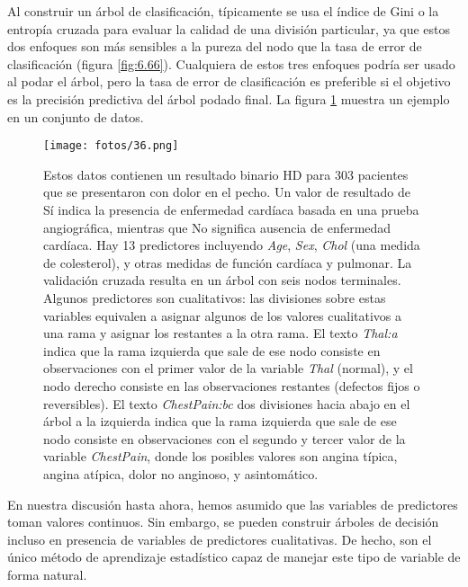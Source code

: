 Al construir un árbol de clasificación, típicamente se usa el índice de Gini o la entropía cruzada para evaluar la calidad de una división particular, ya que estos dos enfoques son más sensibles a la pureza del nodo que la tasa de error de clasificación (figura \ref{fig:6.66}). Cualquiera de estos tres enfoques podría ser usado al podar el árbol, pero la tasa de error de clasificación es preferible si el objetivo es la precisión predictiva del árbol podado final. La figura \ref{fig:6.7} muestra un ejemplo en un conjunto de datos. \\
\begin{figure}[h]
\centering
\texttt{[image: fotos/36.png]}
\caption{Estos datos contienen un resultado binario HD para 303 pacientes que se presentaron con dolor en el pecho. Un valor de resultado de Sí indica la presencia de enfermedad cardíaca basada en una prueba angiográfica, mientras que No significa ausencia de enfermedad cardíaca. Hay 13 predictores incluyendo \textit{Age}, \textit{Sex}, \textit{Chol} (una medida de colesterol), y otras medidas de función cardíaca y pulmonar. La validación cruzada resulta en un árbol con seis nodos terminales. Algunos predictores son cualitativos: las divisiones sobre estas variables equivalen a asignar algunos de los valores cualitativos a una rama y asignar los restantes a la otra rama. El texto \textit{Thal:a} indica que la rama izquierda que sale de ese nodo consiste en observaciones con el primer valor de la variable \textit{Thal} (normal), y el nodo derecho
consiste en las observaciones restantes (defectos fijos o reversibles). El texto \textit{ChestPain:bc} dos divisiones hacia abajo en el árbol a la izquierda indica que la rama izquierda que sale de ese nodo consiste en observaciones con el segundo y tercer valor de la variable \textit{ChestPain}, donde los posibles valores son angina típica, angina atípica, dolor no anginoso, y asintomático.}
\label{fig:6.7}
\end{figure}



En nuestra discusión hasta ahora, hemos asumido que las variables de predictores toman valores continuos. Sin embargo, se pueden construir árboles de decisión incluso en presencia de variables de predictores cualitativas. De hecho, son el único método de aprendizaje estadístico capaz de manejar este tipo de variable de forma natural. \\

